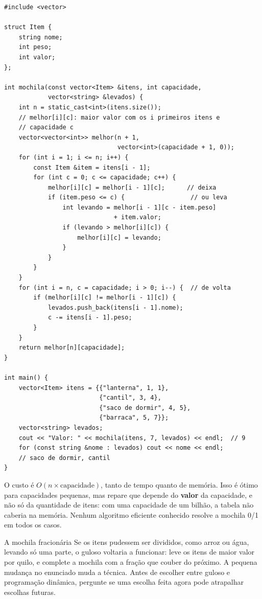 \begin{codigo}
\begin{Verbatim}[breaklines=true, breaksymbolleft={}, fontsize=\footnotesize]
#include <vector>

struct Item {
    string nome;
    int peso;
    int valor;
};

int mochila(const vector<Item> &itens, int capacidade,
            vector<string> &levados) {
    int n = static_cast<int>(itens.size());
    // melhor[i][c]: maior valor com os i primeiros itens e
    // capacidade c
    vector<vector<int>> melhor(n + 1,
                               vector<int>(capacidade + 1, 0));
    for (int i = 1; i <= n; i++) {
        const Item &item = itens[i - 1];
        for (int c = 0; c <= capacidade; c++) {
            melhor[i][c] = melhor[i - 1][c];      // deixa
            if (item.peso <= c) {                  // ou leva
                int levando = melhor[i - 1][c - item.peso]
                              + item.valor;
                if (levando > melhor[i][c]) {
                    melhor[i][c] = levando;
                }
            }
        }
    }
    for (int i = n, c = capacidade; i > 0; i--) {  // de volta
        if (melhor[i][c] != melhor[i - 1][c]) {
            levados.push_back(itens[i - 1].nome);
            c -= itens[i - 1].peso;
        }
    }
    return melhor[n][capacidade];
}

int main() {
    vector<Item> itens = {{"lanterna", 1, 1},
                          {"cantil", 3, 4},
                          {"saco de dormir", 4, 5},
                          {"barraca", 5, 7}};
    vector<string> levados;
    cout << "Valor: " << mochila(itens, 7, levados) << endl;  // 9
    for (const string &nome : levados) cout << nome << endl;
    // saco de dormir, cantil
}
\end{Verbatim}
\end{codigo}

O custo é $O(n \times \text{capacidade})$, tanto de tempo quanto de memória. Isso é ótimo para capacidades pequenas, mas repare que depende do \textbf{valor} da capacidade, e não só da quantidade de itens: com uma capacidade de um bilhão, a tabela não caberia na memória. Nenhum algoritmo eficiente conhecido resolve a mochila 0/1 em todos os casos.

\begin{destaque}{A mochila fracionária}
Se os itens pudessem ser divididos, como arroz ou água, levando só uma parte, o guloso voltaria a funcionar: leve os itens de maior valor por quilo, e complete a mochila com a fração que couber do próximo. A pequena mudança no enunciado muda a técnica. Antes de escolher entre guloso e programação dinâmica, pergunte se uma escolha feita agora pode atrapalhar escolhas futuras.
\end{destaque}

